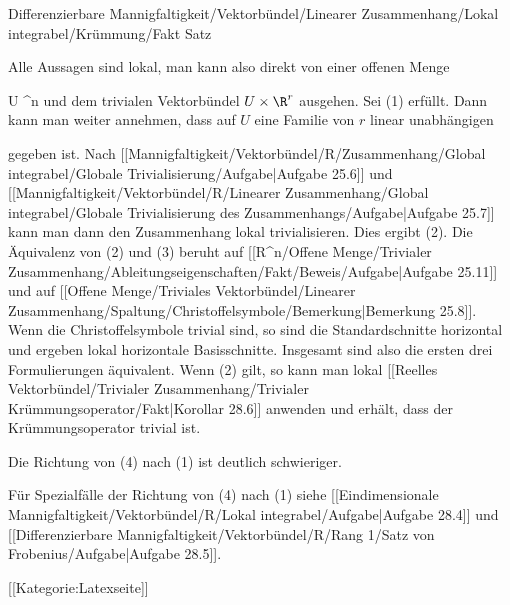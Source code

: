 {Differenzierbare Mannigfaltigkeit/Vektorbündel/Linearer Zusammenhang/Lokal integrabel/Krümmung/Fakt}
{Satz}
{}
{

\faktzusatz {}
\faktzusatz {}

}
{

Alle Aussagen sind lokal, man kann also direkt von einer offenen Menge

\mavergleichskette
{\vergleichskette
{ U
}
{ \subseteq }{ \R^n
}
{  }{
}
{    }{
}
{   }{
}
}
{}{}{}
und dem trivialen Vektorbündel $U \times \R^r$ ausgehen. Sei (1) erfüllt. Dann kann man weiter annehmen, dass auf $U$ eine Familie von $r$ linear unabhängigen

 gegeben ist. Nach
[[Mannigfaltigkeit/Vektorbündel/R/Zusammenhang/Global integrabel/Globale Trivialisierung/Aufgabe|Aufgabe 25.6]]
und
[[Mannigfaltigkeit/Vektorbündel/R/Linearer Zusammenhang/Global integrabel/Globale Trivialisierung des Zusammenhangs/Aufgabe|Aufgabe 25.7]]
kann man dann den Zusammenhang lokal trivialisieren. Dies ergibt (2). Die Äquivalenz von (2) und (3) beruht auf
[[R^n/Offene Menge/Trivialer Zusammenhang/Ableitungseigenschaften/Fakt/Beweis/Aufgabe|Aufgabe 25.11]]
und auf
[[Offene Menge/Triviales Vektorbündel/Linearer Zusammenhang/Spaltung/Christoffelsymbole/Bemerkung|Bemerkung 25.8]].
Wenn die Christoffelsymbole trivial sind, so sind die Standardschnitte horizontal und ergeben lokal horizontale Basisschnitte. Insgesamt sind also die ersten drei Formulierungen äquivalent. Wenn (2) gilt, so kann man lokal
[[Reelles Vektorbündel/Trivialer Zusammenhang/Trivialer Krümmungsoperator/Fakt|Korollar 28.6]]
anwenden und erhält, dass der Krümmungsoperator trivial ist.

Die Richtung von (4) nach (1) ist deutlich schwieriger.

}

Für Spezialfälle der Richtung von (4) nach (1) siehe
[[Eindimensionale Mannigfaltigkeit/Vektorbündel/R/Lokal integrabel/Aufgabe|Aufgabe 28.4]]
und
[[Differenzierbare Mannigfaltigkeit/Vektorbündel/R/Rang 1/Satz von Frobenius/Aufgabe|Aufgabe 28.5]].

 [[Kategorie:Latexseite]]
